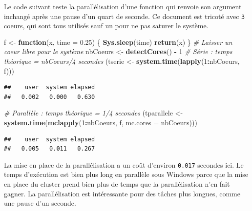 \documentclass[
  12pt,
  french,
  a4paper,
  extrafontsizes,onecolumn,openright
  ]{memoir}
\newenvironment{Shaded}{\begin{snugshade}}{\end{snugshade}}
\newcommand{\CommentTok}[1]{\textcolor[rgb]{0.56,0.35,0.01}{\textit{#1}}}
\newcommand{\ControlFlowTok}[1]{\textcolor[rgb]{0.13,0.29,0.53}{\textbf{#1}}}
\newcommand{\DataTypeTok}[1]{\textcolor[rgb]{0.13,0.29,0.53}{#1}}
\newcommand{\DecValTok}[1]{\textcolor[rgb]{0.00,0.00,0.81}{#1}}
\newcommand{\FloatTok}[1]{\textcolor[rgb]{0.00,0.00,0.81}{#1}}
\newcommand{\KeywordTok}[1]{\textcolor[rgb]{0.13,0.29,0.53}{\textbf{#1}}}
\newcommand{\NormalTok}[1]{#1}
\newcommand{\OperatorTok}[1]{\textcolor[rgb]{0.81,0.36,0.00}{\textbf{#1}}}
\newcommand{\StringTok}[1]{\textcolor[rgb]{0.31,0.60,0.02}{#1}}
\begin{document}
\normalsize

Le code suivant teste la parallélisation d'une fonction qui renvoie son argument inchangé après une pause d'un quart de seconde.
Ce document est tricoté avec \texttt{3} coeurs, qui sont tous utilisés sauf un pour ne pas saturer le système.

\scriptsize

\begin{Shaded}
\begin{Highlighting}[]
\NormalTok{f <-}\StringTok{ }\ControlFlowTok{function}\NormalTok{(x, }\DataTypeTok{time =} \FloatTok{0.25}\NormalTok{) \{}
    \KeywordTok{Sys.sleep}\NormalTok{(time)}
    \KeywordTok{return}\NormalTok{(x)}
\NormalTok{\}}
\CommentTok{# Laisser un coeur libre pour le système}
\NormalTok{nbCoeurs <-}\StringTok{ }\KeywordTok{detectCores}\NormalTok{() }\OperatorTok{-}\StringTok{ }\DecValTok{1}
\CommentTok{# Série : temps théorique = nbCoeurs/4 secondes}
\NormalTok{(tserie <-}\StringTok{ }\KeywordTok{system.time}\NormalTok{(}\KeywordTok{lapply}\NormalTok{(}\DecValTok{1}\OperatorTok{:}\NormalTok{nbCoeurs, f)))}
\end{Highlighting}
\end{Shaded}

\begin{verbatim}
##    user  system elapsed 
##   0.002   0.000   0.630
\end{verbatim}

\begin{Shaded}
\begin{Highlighting}[]
\CommentTok{# Parallèle : temps théorique = 1/4 secondes}
\NormalTok{(tparallele <-}\StringTok{ }\KeywordTok{system.time}\NormalTok{(}\KeywordTok{mclapply}\NormalTok{(}\DecValTok{1}\OperatorTok{:}\NormalTok{nbCoeurs, f, }\DataTypeTok{mc.cores =}\NormalTok{ nbCoeurs)))}
\end{Highlighting}
\end{Shaded}

\begin{verbatim}
##    user  system elapsed 
##   0.005   0.011   0.267
\end{verbatim}

\normalsize

La mise en place de la parallélisation a un coût d'environ \texttt{0.017} secondes ici.
Le temps d'exécution est bien plus long en parallèle sous Windows parce que la mise en place du cluster prend bien plus de temps que la parallélisation n'en fait gagner.
La parallélisation est intéressante pour des tâches plus longues, comme une pause d'un seconde.
\end{document}
